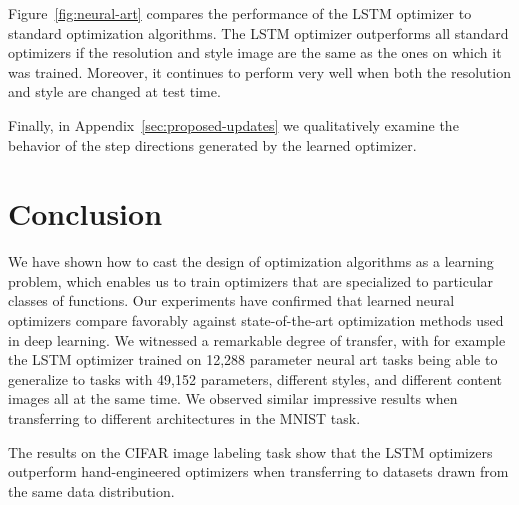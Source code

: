 \documentclass{article}
\begin{document}
Figure~\ref{fig:neural-art} compares the performance of the LSTM optimizer to
standard optimization algorithms.  The LSTM optimizer outperforms all standard
optimizers if the resolution and style image are the same as the ones on which
it was trained.  Moreover, it continues to perform very well when both the
resolution and style are changed at test time.

Finally, in Appendix~\ref{sec:proposed-updates} we qualitatively examine the
behavior of the step directions generated by the learned optimizer.






\section{Conclusion}

We have shown how to cast the design of optimization algorithms as a learning
problem, which enables us to train optimizers that are specialized to
particular classes of functions.  Our experiments have confirmed that learned
neural optimizers compare favorably against state-of-the-art optimization
methods used in deep learning. We witnessed a remarkable degree of transfer,
with for example the LSTM optimizer trained on 12,288 parameter neural art
tasks being able to generalize to tasks with 49,152 parameters, different
styles, and different content images all at the same time. We observed similar
impressive results when transferring to different architectures in the MNIST
task.

The results on the CIFAR image labeling task show that the LSTM optimizers
outperform hand-engineered optimizers when transferring to datasets drawn from
the same data distribution.
 
\end{document}
